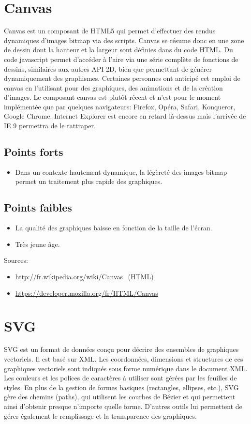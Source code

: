 \documentclass[a4paper,10pt]{report}
\begin{document}
\section{Canvas}
Canvas est un composant de HTML5 qui permet d'effectuer des rendus dynamiques d'images 
bitmap via des scripts.
Canvas se résume donc en une zone de dessin dont la hauteur et la largeur sont définies 
dans du code HTML. Du code javascript permet d'accéder à l'aire via une série complète de fonctions de dessins, 
similaires aux autres API 2D, bien que permettant de générer dynamiquement des graphismes. Certaines personnes ont anticipé cet emploi de canvas en l'utilisant pour des graphiques, des animations et de la création d'images.
Le composant canvas est plutôt récent et n'est pour le moment implémentée que par 
quelques navigateurs: Firefox, Opéra, Safari, Konqueror, Google Chrome. 
Internet Explorer est encore en retard là-dessus mais l'arrivée de IE 9 permettra
 de le rattraper.

\subsection{Points forts}

\begin{itemize}
  \item Dans un contexte hautement dynamique, la légèreté des images bitmap permet un traitement plus rapide des graphiques.
\end{itemize}

\subsection{Points faibles}

\begin{itemize}
  \item La qualité des graphiques baisse en fonction de la taille de l'écran.
  \item Très jeune âge.
\end{itemize}

 Sources:
\begin{itemize}
\item \url{http://fr.wikipedia.org/wiki/Canvas_(HTML)}
\item \url{https://developer.mozilla.org/fr/HTML/Canvas}
\end{itemize} 
	  

\section{SVG}
SVG est un format de données conçu pour décrire des ensembles de graphiques vectoriels. 
Il est basé sur XML. Les coordonnées, dimensions et structures de ces graphiques 
vectoriels sont indiqués sous forme numérique dans le document XML. 
Les couleurs et les polices de caractères à utiliser sont gérées par 
les feuilles de styles. 
En plus de la gestion de formes basiques (rectangles, ellipses, etc.), SVG gère
 des chemins (paths), qui utilisent les courbes de Bézier et qui permettent ainsi
 d'obtenir presque n'importe quelle forme.  D'autres outils lui permettent de gérer 
également le remplissage et la transparence des graphiques.
\end{document}
